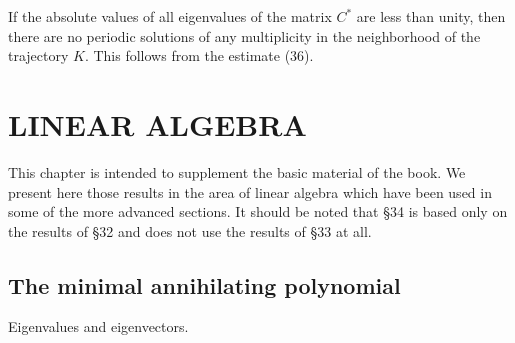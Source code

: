 \documentclass[10pt,a5paper]{book}
\theoremstyle{plain}
\theoremstyle{definition}
\theoremstyle{remark}
\begin{document}
If the absolute values of all eigenvalues of the matrix $C^{*}$ are less than unity, then there are no periodic solutions of any multiplicity in the neighborhood of the trajectory $K$. This follows from the estimate (36).

\chapter{LINEAR ALGEBRA}
This chapter is intended to supplement the basic material of the book. We present here those results in the area of linear algebra which have been used in some of the more advanced sections. It should be noted that §34 is based only on the results of §32 and does not use the results of §33 at all.

\section{The minimal annihilating polynomial}
Eigenvalues and eigenvectors.
\end{document}
